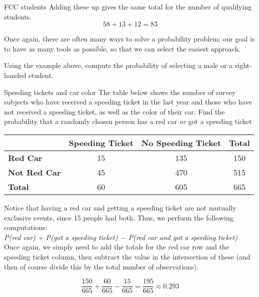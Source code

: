 \begin{example}[https://www.youtube.com/watch?v=Z3FKbz7RnSs]{FCC students}
Adding these up gives the same total for the number of qualifying students.
\[58 + 13 + 12 = 83\]

Once again, there are often many ways to solve a probability problem; our goal is to have as many tools as possible, so that we can select the easiest approach.
\end{example}

\begin{try}
Using the example above, compute the probability of selecting a male or a right-handed student. 
\end{try}
\vfill
\pagebreak

\begin{example}[https://www.youtube.com/watch?v=QE9xCoQBclw]{Speeding tickets and car color} 
The table below shows the number of survey subjects who have received a speeding ticket in the last year and those who have not received a speeding ticket, as well as the color of their car. Find the probability that a randomly chosen person has a red car \emph{or} got a speeding ticket
\begin{center}
\begin{tabular}{l | c c c}
 & \textbf{Speeding Ticket} & \textbf{No Speeding Ticket} & \textbf{Total} \\ \hline 
\textbf{Red Car} & 15 & 135 & 150\\
\textbf{Not Red Car} & 45 & 470 & 515  \\ \hline
\textbf{Total} & 60 & 605 & 665  
\end{tabular}
\end{center}	

\sol
Notice that having a red car and getting a speeding ticket are not mutually exclusive events, since 15 people had both. Thus, we perform the following computations: \\

\emph{P(red car) + P(got a speeding ticket) $-$ P(red car and got a speeding ticket)}\\

Once again, we simply need to add the totals for the red car row and the speeding ticket column, then subtract the value in the intersection of these (and then of course divide this by the total number of observations).

\[\frac{150}{665} + \frac{60}{665} - \frac{15}{665}  = \boxed{\frac{195}{665}  \approx 0.293}\]
\end{example}

